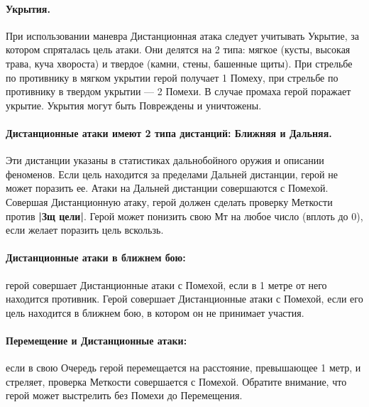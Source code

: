 \paragraph{Укрытия.} При использовании маневра Дистанционная атака следует учитывать Укрытие, за котором спряталась цель атаки. Они делятся на 2 типа: мягкое (кусты, высокая трава, куча хвороста) и твердое (камни, стены, башенные щиты). При стрельбе по противнику в мягком укрытии герой получает 1 Помеху, при стрельбе по противнику в твердом укрытии — 2 Помехи. В случае промаха герой поражает укрытие. Укрытия могут быть Повреждены и уничтожены.
\paragraph{Дистанционные атаки имеют 2 типа дистанций: Ближняя и Дальняя.} Эти дистанции указаны в статистиках дальнобойного оружия и описании феноменов. Если цель находится за пределами Дальней дистанции, герой не может поразить ее. Атаки на Дальней дистанции совершаются с Помехой. Совершая Дистанционную атаку, герой должен сделать проверку Меткости против \textbf{|Зщ цели|}. Герой может понизить свою Мт на любое число (вплоть до 0), если желает поразить цель вскользь.
\paragraph{Дистанционные атаки в ближнем бою:} герой совершает Дистанционные атаки с Помехой, если в 1 метре от него находится противник. Герой совершает Дистанционные атаки с Помехой, если его цель находится в ближнем бою, в котором он не принимает участия.
\paragraph{Перемещение и Дистанционные атаки:} если в свою Очередь герой перемещается на расстояние, превышающее 1 метр, и стреляет, проверка Меткости совершается с Помехой. Обратите внимание, что герой может выстрелить без Помехи до Перемещения.
